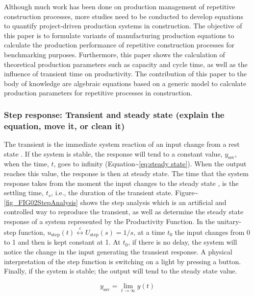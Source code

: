 \documentclass{article}
\begin{document}
Although much work has been done on production management of repetitive construction processes, more studies need to be conducted to develop equations to quantify project-driven production systems in construction.
The objective of this paper is to formulate variants of manufacturing production equations to calculate the production performance of repetitive construction processes for benchmarking purposes.
Furthermore, this paper shows the calculation of theoretical production parameters such as capacity and cycle time, as well as the influence of transient time on productivity.
The contribution of this paper to the body of knowledge are algebraic equations based on a generic model to calculate production parameters for repetitive processes in construction.

\subsubsection{Step response: Transient and steady state (explain the equation, move it, or clean it)}
\label{sec:org3e47b41}

The transient is the immediate system reaction of an input change from a rest state \citep{Ogata2010}.
If the system is stable, the response will tend to a constant value, \(y_{\mbox{ssv}}\), when the time, \(t\), goes to infinity (Equation\textasciitilde{}\ref{eq:steady state}).
When the output reaches this value, the response is then at steady state.
The time that the system response takes from the moment the input changes to the steady state \citep{Nise2010,Ogata2010}, is the settling time, \(t_s\), i.e., the duration of the transient state.
Figure\textasciitilde{}\ref{fig_FIG02StepAnalysis} shows the step analysis which is an artificial and controlled way to reproduce the transient, as well as determine the steady state response of a system represented by the Productivity Function.
In the unitary-step function, \(u_{\mbox{step}}(t) \overset{\underset{\mathrm{\mathcal{L}}}{}}{\leftrightarrow} U_{\mbox{step}}(s) = 1/s\), at a time \(t_0\) the input changes from 0 to 1 and then is kept constant at 1.
At \(t_0\), if there is no delay, the system will notice the change in the input generating the transient response.
A physical interpretation of the step function is switching on a light by pressing a button.
Finally, if the system is stable; the output will tend to the steady state value.

\begin{equation}\label{eq:steady state}
	y_{\mbox{ssv}} = \lim_{t\rightarrow \infty} y(t)
\end{equation}
\end{document}
